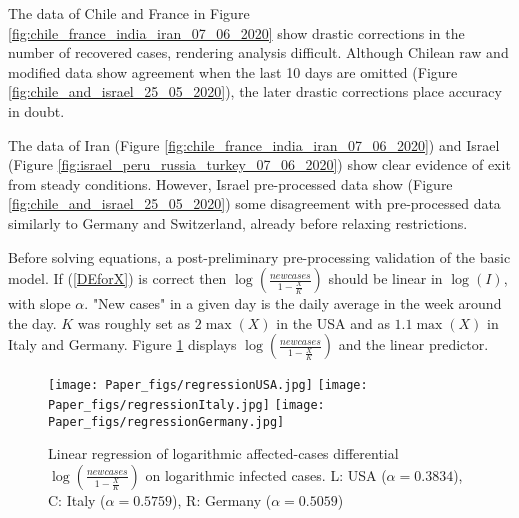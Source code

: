 \documentclass{article}
\begin{document}
The data of Chile and France in Figure \ref{fig:chile_france_india_iran_07_06_2020} show drastic corrections in the number of recovered cases, rendering analysis difficult. Although Chilean raw and modified data show agreement when the last 10 days are omitted (Figure \ref{fig:chile_and_israel_25_05_2020}), the later drastic corrections place accuracy in doubt.

The data of Iran (Figure \ref{fig:chile_france_india_iran_07_06_2020}) and Israel (Figure \ref{fig:israel_peru_russia_turkey_07_06_2020}) show clear evidence of exit from steady conditions. However, Israel pre-processed data show (Figure \ref{fig:chile_and_israel_25_05_2020}) some disagreement with pre-processed data similarly to Germany and Switzerland, already before relaxing restrictions.

\bigskip
Before solving equations, a post-preliminary pre-processing validation of the basic model. If (\ref{DEforX}) is correct then $\log(\frac{newcases}{1-\frac{X}{K}})$ should be linear in $\log(I)$, with slope $\alpha$. "New cases" in a given day is the daily average in the week around the day. $K$ was roughly set as $2 \max(X)$ in the USA and as $1.1 \max(X)$ in Italy and Germany. Figure \ref{fig:linear_prediction_of_log_new_cases} displays $\log(\frac{newcases}{1-\frac{X}{K}})$ and the linear predictor.

\begin{figure}[ht]
    \begin{center}
{\texttt{[image: Paper\_figs/regressionUSA.jpg]}}
\qquad
{\texttt{[image: Paper\_figs/regressionItaly.jpg]}}
\qquad
{\texttt{[image: Paper\_figs/regressionGermany.jpg]}}
    \end{center}
    \caption{Linear regression of logarithmic affected-cases differential $\log(\frac{newcases}{1-\frac{X}{K}})$ on logarithmic infected cases. L: USA ($\alpha=0.3834$), C: Italy ($\alpha=0.5759$), R: Germany ($\alpha=0.5059$)}
    \label{fig:linear_prediction_of_log_new_cases}
\end{figure}
\end{document}
